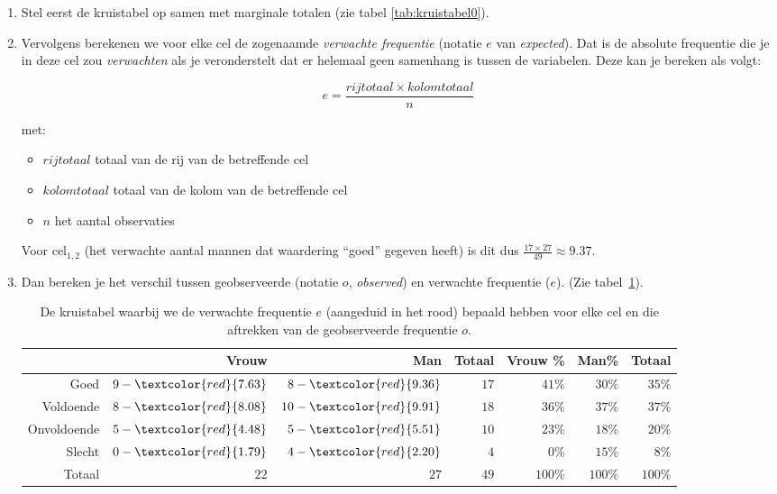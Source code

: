 \begin{enumerate}
  \item Stel eerst de kruistabel op samen met marginale totalen (zie tabel \ref{tab:kruistabel0}).
  \item Vervolgens berekenen we voor elke cel de zogenaamde \emph{verwachte frequentie} (notatie $e$ van \emph{expected}). Dat is de absolute frequentie die je in deze cel zou \emph{verwachten} als je veronderstelt dat er helemaal geen samenhang is tussen de variabelen. Deze kan je bereken als volgt:
  
  \begin{equation}
  e = \frac{rijtotaal \times kolomtotaal}{n}
  \end{equation}
  
  met:
  
  \begin{itemize}
    \item $rijtotaal$ totaal van de rij van de betreffende cel
    \item $kolomtotaal$ totaal van de kolom van de betreffende cel
    \item $n$ het aantal observaties
  \end{itemize}
  
  Voor cel$_{1,2}$ (het verwachte aantal mannen dat waardering ``goed'' gegeven heeft) is dit dus $\frac{17 \times 27}{49} \approx 9.37$.
  
  \item Dan bereken je het verschil tussen geobserveerde (notatie $o$, \emph{observed}) en verwachte frequentie ($e$). (Zie tabel~\ref{tab:kruistabel2}).
  
  \begin{table} \centering
    \begin{tabular}{@{}rrrrrrr@{}}
    	\toprule
    	            &                       Vrouw &                          Man & Totaal & Vrouw \% &   Man\% &  Totaal \\
    	\midrule
    	       Goed &  $9 -\textcolor{red}{7.63}$ &  $8 - \textcolor{red}{9.36}$ &   $17$ &   $41$\% &  $30$\% &  $35$\% \\
    	  Voldoende & $8 - \textcolor{red}{8.08}$ & $10 - \textcolor{red}{9.91}$ &   $18$ &   $36$\% &  $37$\% &  $37$\% \\
    	Onvoldoende & $5 - \textcolor{red}{4.48}$ &  $5 - \textcolor{red}{5.51}$ &   $10$ &   $23$\% &  $18$\% &  $20$\% \\
    	     Slecht & $0 - \textcolor{red}{1.79}$ &  $4 - \textcolor{red}{2.20}$ &    $4$ &    $0$\% &  $15$\% &   $8$\% \\
    	     Totaal &                        $22$ &                         $27$ &   $49$ &  $100$\% & $100$\% & $100$\% \\
    	\bottomrule
    \end{tabular}
    \caption{De kruistabel waarbij we de verwachte frequentie $e$ (aangeduid in het rood) bepaald hebben voor elke cel en die aftrekken van de geobserveerde frequentie $o$.}
    \label{tab:kruistabel2}
  \end{table}
  

\end{enumerate}
